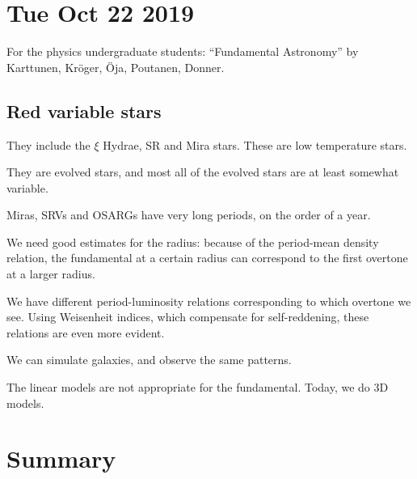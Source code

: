 \documentclass[main.tex]{subfiles}
\begin{document}
\section*{Tue Oct 22 2019}

For the physics undergraduate students: ``Fundamental Astronomy'' by Karttunen, Kröger, Öja, Poutanen, Donner.

\subsection{Red variable stars}

They include the \(\xi \) Hydrae, SR and Mira stars.
These are low temperature stars.

They are evolved stars, and most all of the evolved stars are at least somewhat variable.

Miras, SRVs and OSARGs have very long periods, on the order of a year.

We need good estimates for the radius: because of the period-mean density relation, the fundamental at a certain radius can correspond to the first overtone at a larger radius.

We have different period-luminosity relations corresponding to which overtone we see.
Using Weisenheit indices, which compensate for self-reddening, these relations are even more evident.

We can simulate galaxies, and observe the same patterns.

The linear models are not appropriate for the fundamental.
Today, we do 3D models.

\section{Summary}
\end{document}

